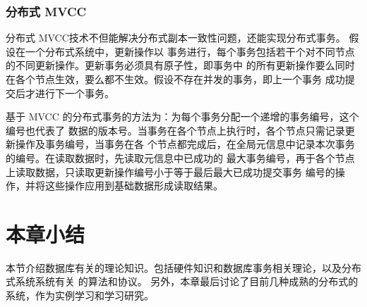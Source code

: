 \subsubsection{分布式 MVCC}
分布式 MVCC技术不但能解决分布式副本一致性问题，还能实现分布式事务。
假设在一个分布式系统中，更新操作以
事务进行，每个事务包括若干个对不同节点的不同更新操作。更新事务必须具有原子性，即事务中
的所有更新操作要么同时在各个节点生效，要么都不生效。假设不存在并发的事务，即上一个事务
成功提交后才进行下一个事务。

基于 MVCC 的分布式事务的方法为：为每个事务分配一个递增的事务编号，这个编号也代表了
数据的版本号。当事务在各个节点上执行时，各个节点只需记录更新操作及事务编号，当事务在各
个节点都完成后，在全局元信息中记录本次事务的编号。在读取数据时，先读取元信息中已成功的
最大事务编号，再于各个节点上读取数据，只读取更新操作编号小于等于最后最大已成功提交事务
编号的操作，并将这些操作应用到基础数据形成读取结果。
\section{本章小结}
本节介绍数据库有关的理论知识。包括硬件知识和数据库事务相关理论，以及分布式系统系统有关
的算法和协议。
另外，本章最后讨论了目前几种成熟的分布式的系统，作为实例学习和学习研究。